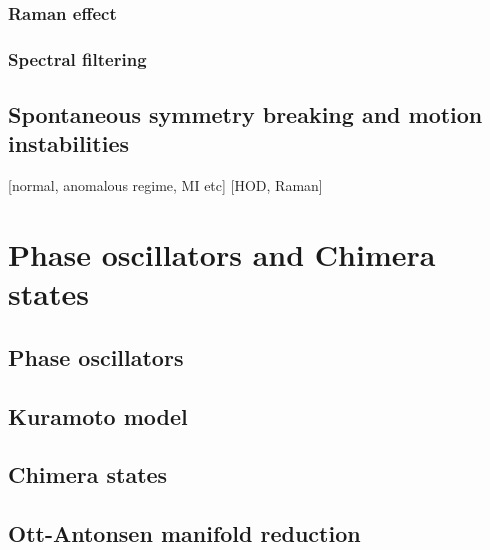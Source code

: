 \subsubsection{Raman effect}
\subsubsection{Spectral filtering}

\subsection{Spontaneous symmetry breaking and motion instabilities}

[normal, anomalous regime, MI etc]
[HOD, Raman]

\section{Phase oscillators and Chimera states}
\subsection{Phase oscillators}
\label{sec:phase_oscillators}

\subsection{Kuramoto model}

\subsection{Chimera states}

\subsection{Ott-Antonsen manifold reduction}